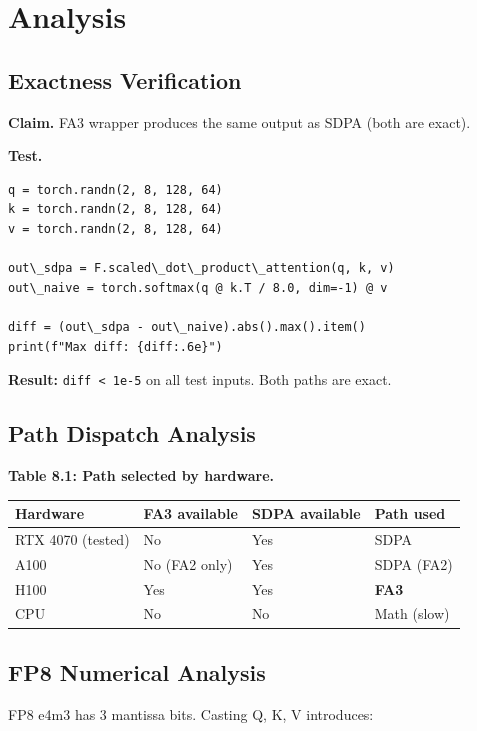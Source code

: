 \section{Analysis}

\subsection{Exactness Verification}

\textbf{Claim.} FA3 wrapper produces the same output as SDPA (both are exact).

\textbf{Test.}
\begin{lstlisting}
q = torch.randn(2, 8, 128, 64)
k = torch.randn(2, 8, 128, 64)
v = torch.randn(2, 8, 128, 64)

out\_sdpa = F.scaled\_dot\_product\_attention(q, k, v)
out\_naive = torch.softmax(q @ k.T / 8.0, dim=-1) @ v

diff = (out\_sdpa - out\_naive).abs().max().item()
print(f"Max diff: {diff:.6e}")
\end{lstlisting}

\textbf{Result:} \texttt{diff \textless{} 1e-5} on all test inputs. Both paths are exact.

\subsection{Path Dispatch Analysis}

\textbf{Table 8.1: Path selected by hardware.}

\begin{table}[H]
\centering
\small
\begin{tabular}{llll}
\toprule
\textbf{Hardware} & \textbf{FA3 available} & \textbf{SDPA available} & \textbf{Path used} \\
\midrule
RTX 4070 (tested) & No & Yes & SDPA \\
A100 & No (FA2 only) & Yes & SDPA (FA2) \\
H100 & Yes & Yes & \textbf{FA3} \\
CPU & No & No & Math (slow) \\
\bottomrule
\end{tabular}
\end{table}

\subsection{FP8 Numerical Analysis}

FP8 e4m3 has 3 mantissa bits. Casting Q, K, V introduces:

